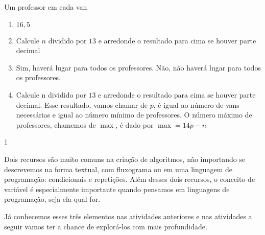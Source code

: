 \begin{answer}{Um professor em cada van}
{
\begin{enumerate}
\item $16{,}5$

\item Calcule $n$ dividido por $13$ e arredonde o resultado para cima se houver parte decimal

\item Sim, haverá lugar para todos os professores. Não, não haverá lugar para todos os professores.

\item Calcule n dividido por $13$ e arredonde o resultado para cima se houver parte decimal. Esse resultado, vamos chamar de $p$, é igual ao número de vans necessárias e igual ao número mínimo de professores. O número máximo de professores, chamemos de $\max$, é dado por $\max=14p-n$
\end{enumerate}
}{1}
\end{answer}

\label{comp_exp3}


Dois recursos são muito comuns na criação de algoritmos, não importando se descrevemos na forma textual, com fluxograma ou em uma linguagem de programação: condicionais e repetições. Além desses dois recursos, o conceito de variável é especialmente importante quando pensamos em linguagens de programação, seja ela qual for.

Já conhecemos esses três elementos nas atividades anteriores e nas atividades a seguir vamos ter a chance de explorá-los com mais profundidade.

